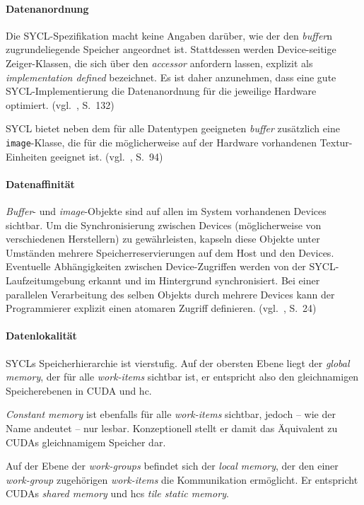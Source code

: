 \paragraph{Datenanordnung}

Die SYCL-Spezifikation macht keine Angaben darüber, wie der den \textit{buffer}n
zugrundeliegende Speicher angeordnet ist. Stattdessen werden Device-seitige
Zeiger-Klassen, die sich über den \textit{accessor} anfordern lassen, explizit
als \textit{implementation defined} bezeichnet. Es ist daher anzunehmen, dass
eine gute SYCL-Implementierung die Datenanordnung für die jeweilige Hardware
optimiert. (vgl.~\cite{syclspec}, S.\ 132)

SYCL bietet neben dem für alle Datentypen geeigneten \textit{buffer} zusätzlich
eine \texttt{image}-Klasse, die für die möglicherweise auf der Hardware
vorhandenen Textur-Einheiten geeignet ist. (vgl.~\cite{syclspec}, S.\ 94)

\paragraph{Datenaffinität}

\textit{Buffer}- und \textit{image}-Objekte sind auf allen im System vorhandenen
Devices sichtbar. Um die Synchronisierung zwischen Devices (möglicherweise von
verschiedenen Herstellern) zu gewährleisten, kapseln diese Objekte unter
Umständen mehrere Speicherreservierungen auf dem Host und den Devices.
Eventuelle Abhängigkeiten zwischen Device-Zugriffen werden von der
SYCL-Laufzeitumgebung erkannt und im Hintergrund synchronisiert. Bei einer
parallelen Verarbeitung des selben Objekts durch mehrere Devices kann der
Programmierer explizit einen atomaren Zugriff definieren.
(vgl.~\cite{syclspec}, S.\ 24)

\paragraph{Datenlokalität}

SYCLs Speicherhierarchie ist vierstufig. Auf der obersten Ebene liegt der
\textit{global memory}, der für alle \textit{work-items} sichtbar ist, er
entspricht also den gleichnamigen Speicherebenen in CUDA und \gls{hc}.

\textit{Constant memory} ist ebenfalls für alle \textit{work-items} sichtbar,
jedoch -- wie der Name andeutet -- nur lesbar. Konzeptionell stellt er damit
das Äquivalent zu CUDAs gleichnamigem Speicher dar.

Auf der Ebene der \textit{work-groups} befindet sich der \textit{local memory},
der den einer \textit{work-group} zugehörigen \textit{work-items} die
Kommunikation ermöglicht. Er entspricht CUDAs \textit{shared memory} und
\gls{hc}s \textit{tile static memory}.

